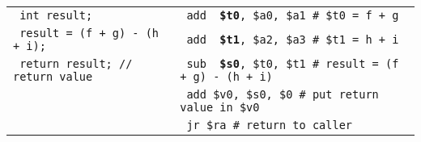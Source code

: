\documentclass[../main.tex]{subfiles}
\begin{document}
\begin{table}[h!]
\begin{tabular}{ l l }
        \texttt{\hspace*{0cm} \hspace*{0cm} \hspace*{0cm} \hspace*{0cm} int result;} & \texttt{\hspace*{0cm} \hspace*{0cm} \hspace*{0cm} \hspace*{0cm} add {\color{red} \textbf{\$t0}}, \$a0, \$a1 \hspace*{0cm} \# \$t0 = f + g} \\
        \texttt{\hspace*{0cm} \hspace*{0cm} \hspace*{0cm} \hspace*{0cm} result = (f + g) - (h + i);} & \texttt{\hspace*{0cm} \hspace*{0cm} \hspace*{0cm} \hspace*{0cm} add {\color{red} \textbf{\$t1}}, \$a2, \$a3 \hspace*{0cm} \# \$t1 = h + i} \\
        \texttt{\hspace*{0cm} \hspace*{0cm} \hspace*{0cm} \hspace*{0cm} return result; // return value} & \texttt{\hspace*{0cm} \hspace*{0cm} \hspace*{0cm} \hspace*{0cm} sub {\color{red} \textbf{\$s0}}, \$t0, \$t1 \hspace*{0cm} \# result = (f + g) - (h + i)} \\
        & \texttt{\hspace*{0cm} \hspace*{0cm} \hspace*{0cm} \hspace*{0cm} add \$v0, \$s0, \$0 \hspace*{0cm} \hspace*{0cm} \# put return value in \$v0} \\
        & \texttt{\hspace*{0cm} \hspace*{0cm} \hspace*{0cm} \hspace*{0cm} jr \$ra \hspace*{0cm} \hspace*{0cm} \hspace*{0cm} \hspace*{0cm} \hspace*{0cm} \hspace*{0cm} \hspace*{0cm} \hspace*{0cm} \hspace*{0cm} \hspace*{0cm} \hspace*{0cm} \hspace*{0cm} \# return to caller} \\

\end{tabular}
\end{table}
\end{document}
